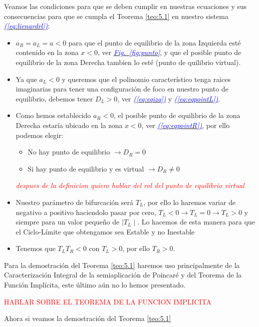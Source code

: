 \documentclass[12pt,a4paper]{report} %
\newcommand{\fref}[1]{\hyperref[#1]{\textcolor{blue}{\textit{Fig.~\ref*{#1}}}}}
\newcommand{\eref}[1]{\hyperref[#1]{\textcolor{blue}{\textit{(\ref*{#1})}}}}
\begin{document}
	Veamos las condiciones para que se deben cumplir en nuestras ecuaciones y sus consecuencias para que se cumpla el Teorema \ref{teo:5.1} en nuestro sistema \eref{eq:lienardrl}:
		\begin{itemize}
			\item $a_R=a_L=a<0$ para que el punto de equilibrio de la zona Izquierda esté contenido en la zona $x<0$, ver \fref{fig:punto}, y que el posible punto de equilibrio de la zona Derecha tambien lo esté (punto de quilibrio virtual).
			\item Ya que $a_L<0$ y queremos que el polinomio característico  tenga raices imaginarias para tener una configuración de foco en nuestro punto de equilibrio, debemos tener $D_L>0$, ver \eref{eq:eqizq} y \eref{eq:eqpointL}.
			\item Como hemos establecido $a_R<0$, el posible punto de equilibrio de la zona Derecha estaría ubicado en la zona $x<0$, ver \eref{eq:eqpointR}, por ello podemos elegir:\begin{itemize}
				\item No hay punto de equilibrio $\rightarrow D_R=0$ 
				\item Si hay punto de equilibrio y es virtual $\rightarrow D_R\neq0$ 
			\end{itemize}
			\textit{\textcolor{red}{despues de la definicion quiero hablar del rol del punto de equilibrio virtual}}
			\item Nuestro parámetro de bifurcación será $T_L$, por ello lo haremos variar de negativo a positivo haciendolo pasar por cero, $T_L<0 \rightarrow T_L=0 \rightarrow T_L>0$ y siempre para un valor pequeño de $\mid T_L \mid$. Lo hacemos de esta manera para que el Ciclo-Límite que obtengamos sea Estable y no Inestable
			\item Tenemos que $T_LT_R<0$ con $T_L>0$, por ello  $T_R>0$.
		\end{itemize}
	
	\newpage
	
	Para la demostración del Teorema \ref{teo:5.1} haremos uso principalmente de la Caracterización Integral de la semiaplicación de Poincaré y del Teorema de la Función Implícita, este último aún no lo hemos presentado.
	
	\vspace{0.5cm}\textcolor{red}{HABLAR SOBRE EL TEOREMA DE LA FUNCION IMPLICITA}
	
	\newpage
	
	Ahora si veamos la demostración del Teorema \ref{teo:5.1}
	
\end{document}
